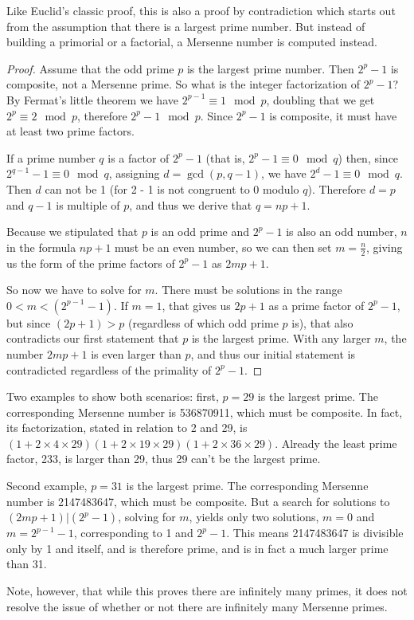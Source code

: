 \documentclass[12pt]{article}
\begin{document}
Like Euclid's classic proof, this is also a proof by contradiction which starts out from the  assumption that there is a largest prime number. But instead of building a primorial or a factorial, a Mersenne number is computed instead.

\begin{proof}
Assume that the odd prime $p$ is the largest prime number. Then $2^p - 1$ is composite, not a Mersenne prime. So what is the integer factorization of $2^p - 1$? By Fermat's little theorem we have $2^{p - 1} \equiv 1 \mod p$, doubling that we get $2^p \equiv 2 \mod p$, therefore $2^p - 1 \mod p$. Since $2^p - 1$ is composite, it must have at least two prime factors.

If a prime number $q$ is a factor of $2^p - 1$ (that is, $2^p - 1 \equiv 0 \mod q$) then, since $2^{q - 1} - 1 \equiv 0 \mod q$, assigning $d = \gcd(p, q - 1)$, we have $2^d - 1 \equiv 0 \mod q$. Then $d$ can not be 1 (for 2 - 1 is not congruent to 0 modulo $q$). Therefore $d = p$ and $q - 1$ is multiple of $p$, and thus we derive that $q = np + 1$.

Because we stipulated that $p$ is an odd prime and $2^p - 1$ is also an odd number, $n$ in the formula $np + 1$ must be an even number, so we can then set $m = \frac{n}{2}$, giving us the form of the prime factors of $2^p - 1$ as $2mp + 1$.

So now we have to solve for $m$. There must be solutions in the range $0 < m < (2^{p - 1} - 1)$. If $m = 1$, that gives us $2p + 1$ as a prime factor of $2^p - 1$, but since $(2p + 1) > p$ (regardless of which odd prime $p$ is), that also contradicts our first statement that $p$ is the largest prime. With any larger $m$, the number $2mp + 1$ is even larger than $p$, and thus our initial statement is contradicted regardless of the primality of $2^p - 1$.
\end{proof}

Two examples to show both scenarios: first, $p = 29$ is the largest prime. The corresponding Mersenne number is 536870911, which must be composite. In fact, its factorization, stated in relation to 2 and 29, is $(1 + 2 \times 4 \times 29)(1 + 2 \times 19 \times 29)(1 + 2 \times 36 \times 29)$. Already the least prime factor, 233, is larger than 29, thus 29 can't be the largest prime.

Second example, $p = 31$ is the largest prime. The corresponding Mersenne number is 2147483647, which must be composite. But a search for solutions to $(2mp + 1) | (2^p - 1)$, solving for $m$, yields only two solutions, $m = 0$ and $m = 2^{p - 1} - 1$, corresponding to 1 and $2^p - 1$. This means 2147483647 is divisible only by 1 and itself, and is therefore prime, and is in fact a much larger prime than 31.

Note, however, that while this proves there are infinitely many primes, it does not resolve the issue of whether or not there are infinitely many Mersenne primes.
\end{document}
